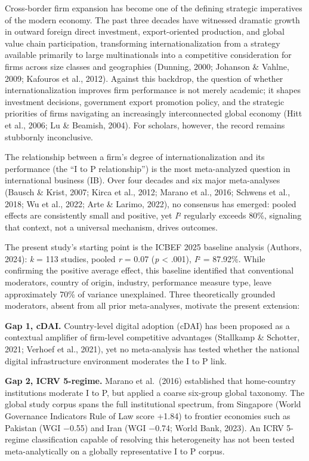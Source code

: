 \documentclass[
  12pt,a4paper]{article}
\begin{document}
Cross-border firm expansion has become one of the defining strategic
imperatives of the modern economy. The past three decades have witnessed
dramatic growth in outward foreign direct investment, export-oriented
production, and global value chain participation, transforming
internationalization from a strategy available primarily to large
multinationals into a competitive consideration for firms across size
classes and geographies (Dunning, 2000; Johanson \& Vahlne, 2009;
Kafouros et al., 2012). Against this backdrop, the question of whether
internationalization improves firm performance is not merely academic;
it shapes investment decisions, government export promotion policy, and
the strategic priorities of firms navigating an increasingly
interconnected global economy (Hitt et al., 2006; Lu \& Beamish, 2004).
For scholars, however, the record remains stubbornly inconclusive.

The relationship between a firm's degree of internationalization and its
performance (the ``I to P relationship'') is the most meta-analyzed
question in international business (IB). Over four decades and six major
meta-analyses (Bausch \& Krist, 2007; Kirca et al., 2012; Marano et al.,
2016; Schwens et al., 2018; Wu et al., 2022; Arte \& Larimo, 2022), no
consensus has emerged: pooled effects are consistently small and
positive, yet \emph{I}² regularly exceeds 80\%, signaling that context,
not a universal mechanism, drives outcomes.

The present study's starting point is the ICBEF 2025 baseline analysis
(Authors, 2024): \emph{k} = 113 studies, pooled \emph{r} = 0.07
(\emph{p} \textless{} .001), \emph{I}² = 87.92\%. While confirming the
positive average effect, this baseline identified that conventional
moderators, country of origin, industry, performance measure type, leave
approximately 70\% of variance unexplained. Three theoretically grounded
moderators, absent from all prior meta-analyses, motivate the present
extension:

\textbf{Gap 1, cDAI.} Country-level digital adoption (cDAI) has been
proposed as a contextual amplifier of firm-level competitive advantages
(Stallkamp \& Schotter, 2021; Verhoef et al., 2021), yet no
meta-analysis has tested whether the national digital infrastructure
environment moderates the I to P link.

\textbf{Gap 2, ICRV 5-regime.} Marano et al.~(2016) established that
home-country institutions moderate I to P, but applied a coarse
six-group global taxonomy. The global study corpus spans the full
institutional spectrum, from Singapore (World Governance Indicators Rule
of Law score +1.84) to frontier economies such as Pakistan (WGI −0.55)
and Iran (WGI −0.74; World Bank, 2023). An ICRV 5-regime classification
capable of resolving this heterogeneity has not been tested
meta-analytically on a globally representative I to P corpus.
\end{document}
